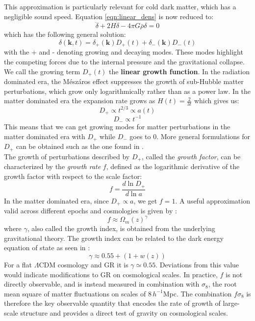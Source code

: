 This approximation is particularly relevant for cold dark matter, which has a negligible sound speed. 
Equation \ref{eqn:linear_dens} is now reduced to:
\begin{equation}
    \ddot{\delta} + 2 H \dot{\delta} - 4\pi G \bar{\rho} \delta = 0
\end{equation}
which has the following general solution:
\begin{equation}
    \delta(\mathbf{k},t) = \delta_+(\mathbf{k})D_+(t) + \delta_-(\mathbf{k})D_-(t)
\end{equation}
with the + and - denoting growing and decaying modes. These modes highlight the competing forces due to the internal pressure and the gravitational collapse. 
We call the growing term $D_+(t)$ the \textbf{linear growth function}. In the radiation dominated era, the Mészáros 
effect suppresses the growth of sub-Hubble matter perturbations, which grow only logarithmically rather than as a power law. In the matter dominated era 
the expansion rate grows as $H(t) = \frac{2}{3t}$ which gives us:
\begin{equation}
    \boxed{D_+ \propto t^{2/3} \propto a(t)}
\end{equation}
\begin{equation}
    D_- \propto t^{-1}
\end{equation}
This means that we can get growing modes for matter perturbations in the matter dominated era with $D_+$ while $D_-$ goes to 0. More general formulations for $D_+$ can be obtained 
such as the one found in \cite{Carroll_1992}. \\

The growth of perturbations described by $D_+$, called the \textit{growth factor}, can be characterized by the \textit{growth rate} $f$, defined as the logarithmic derivative of the growth factor 
with respect to the scale factor:
\begin{equation}
    f = \frac{d \ln D_+}{d \ln a}
\end{equation}
In the matter dominated era, since $D_+ \propto a$, we get $f = 1$. A useful approximation valid across different epochs and cosmologies is given by 
\cite{Peebles_1980}:
\begin{equation}
    \boxed{f \approx \Omega_m(z)^{\gamma}}
\end{equation}
where $\gamma$, also called the growth index, is obtained from the underlying gravitational theory.  
The growth index can be related to the dark energy equation of state as seen in \cite{Linder_2005}:
\begin{equation}
    \gamma \approx 0.55 + (1+w(z))
\end{equation} 
For a flat $\Lambda$CDM cosmology and GR it is $\gamma \simeq 0.55$. Deviations from this value would indicate modifications to GR on cosmological scales. 
In practice, $f$ is not directly observable, and is instead measured in combination with $\sigma_8$, the root mean square of matter fluctuations on scales of 
$8 \, h^{-1}$Mpc. The combination $f\sigma_8$ is therefore the key observable quantity that encodes 
the rate of growth of large-scale structure and provides a direct test of gravity on cosmological scales. \\


